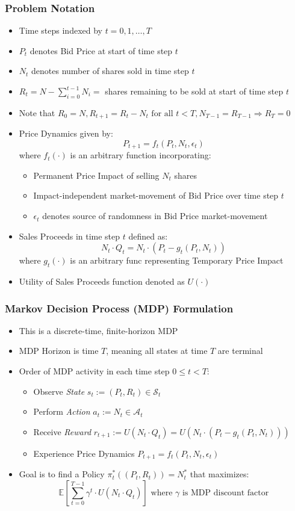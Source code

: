 \documentclass[handout]{beamer}
\begin{document}
\begin{frame}
\frametitle{Problem Notation}
\pause
\begin{itemize}[<+->]
\item Time steps indexed by $t = 0, 1, \ldots, T$
\item $P_t$ denotes Bid Price at start of time step $t$
\item $N_t$ denotes number of shares sold in time step $t$
\item $R_t = N - \sum_{i=0}^{t-1}N_i = $ shares remaining to be sold at start of time step $t$
\item Note that $R_0 = N, R_{t+1}  = R_t - N_t \text{ for all } t < T, N_{T-1} = R_{T-1} \Rightarrow R_T = 0$
\item Price Dynamics given by:
$$P_{t+1} = f_t(P_t, N_t, \epsilon_t)$$
where $f_t(\cdot)$ is an arbitrary function incorporating:
\begin{itemize}
\item Permanent Price Impact of selling $N_t$ shares
\item Impact-independent market-movement of Bid Price over time step $t$
\item $\epsilon_t$ denotes source of randomness in Bid Price market-movement
\end{itemize}
\item Sales Proceeds in time step $t$ defined as:
$$N_t \cdot Q_t = N_t \cdot (P_t - g_t(P_t, N_t))$$
where $g_t(\cdot)$ is an arbitrary func representing Temporary Price Impact
\item Utility of Sales Proceeds function denoted as $U(\cdot)$
\end{itemize}
\end{frame}

\begin{frame}
\frametitle{Markov Decision Process (MDP) Formulation}
\pause
\begin{itemize}[<+->]
\item This is a discrete-time, finite-horizon MDP
\item MDP Horizon is time $T$, meaning all states at time $T$ are terminal
\item Order of MDP activity in each time step $0 \leq t < T$:
\begin{itemize}
\item Observe {\em State} $s_t := (P_t, R_t) \in \mathcal{S}_t$
\item Perform {\em Action} $a_t := N_t \in \mathcal{A}_t$
\item Receive {\em Reward} $r_{t+1} := U(N_t \cdot Q_t) = U(N_t \cdot (P_t - g_t(P_t, N_t)))$
\item Experience Price Dynamics $P_{t+1} = f_t(P_t, N_t, \epsilon_t)$
\end{itemize}
\item Goal is to find a Policy $\pi^*_t((P_t, R_t)) = N_t^*$ that maximizes: $$\mathbb{E}[\sum_{t=0}^{T-1} \gamma^t \cdot U(N_t \cdot Q_t)] \mbox{ where } \gamma \mbox{ is MDP discount factor}$$
\end{itemize}
\end{frame}
\end{document}
